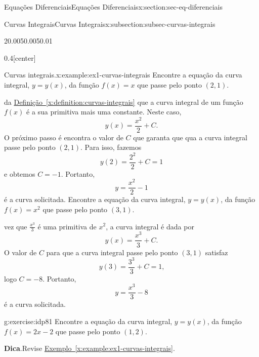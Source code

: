 \documentclass[oneside,10pt,]{article}
\newcommand{\blocktitlefont}{\relax}
\newcommand{\xreffont}{\relax}
\numberwithin{equation}{section}
\begin{document}
\begin{sectionptx}{Equações Diferenciais}{}{Equações Diferenciais}{}{}{x:section:sec-eq-diferenciais}
\begin{subsectionptx}{Curvas Integrais}{}{Curvas Integrais}{}{}{x:subsection:subsec-curvas-integrais}
\begin{sidebyside}{2}{0.005}{0.005}{0.01}
\begin{sbspanel}{0.4}[center]
\end{sbspanel}%
\end{sidebyside}%
%
\begin{example}{Curvas integrais.}{x:example:ex1-curvas-integrais}%
Encontre a equação da curva integral, \(y=y(x)\), da função \(f(x)=x\) que passe pelo ponto \((2,1)\).%
\par\smallskip%
\noindentSegue da \hyperref[x:definition:curvas-integrais]{Definição~{\xreffont\ref{x:definition:curvas-integrais}}} que a curva integral de um função \(f(x)\) é a sua primitiva mais uma constante. Neste caso,%
\begin{equation*}
y(x)= \frac{x^2}{2} + C\text{.}
\end{equation*}
O próximo passo é encontra o valor de \(C\) que garanta que qua a curva integral passe pelo ponto \((2,1)\). Para isso, fazemos%
\begin{equation*}
y(2)= \frac{2^2}{2} + C = 1
\end{equation*}
e obtemos \(C=-1\). Portanto,%
\begin{equation*}
y=\frac{x^2}{2} -1
\end{equation*}
é a curva solicitada.%
 Encontre a equação da curva integral, \(y=y(x)\),  da função \(f(x)=x^2\) que passe pelo ponto \((3,1)\).%
\par\smallskip%
\noindentUma vez que \(\frac{x^3}{3}\) é uma primitiva de \(x^2\), a curva integral é dada por%
\begin{equation*}
y(x)= \frac{x^3}{3} + C\text{.}
\end{equation*}
O valor de \(C\) para que  a curva integral passe pelo ponto \((3,1)\) satisfaz%
\begin{equation*}
y(3)= \frac{3^3}{3} + C = 1\text{,}
\end{equation*}
logo \(C=-8\). Portanto,%
\begin{equation*}
y=\frac{x^3}{3} -8
\end{equation*}
é a curva solicitada.%
%
\end{example}
\begin{inlineexercise}{}{g:exercise:idp81}%
Encontre a equação da curva integral, \(y=y(x)\),  da função \(f(x)=2x-2\) que passe pelo ponto \((1,2)\).%
\par\smallskip%
\noindent\textbf{\blocktitlefont Dica}.\hypertarget{g:hint:idp82}{}\quad{}Revise \hyperref[x:example:ex1-curvas-integrais]{Exemplo~{\xreffont\ref{x:example:ex1-curvas-integrais}}}.%

\end{inlineexercise}
\end{subsectionptx}
\end{sectionptx}
\end{document}
